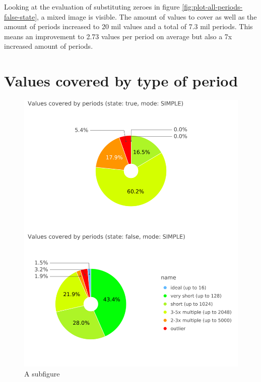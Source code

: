 Looking at the evaluation of substituting zeroes in figure \ref{fig:plot-all-periods-false-state}, a mixed image is visible. The amount of values to cover as well as the amount of periods increased to 20 mil values and a total of 7.3 mil periods. This means an improvement to 2.73 values per period on average but also a 7x increased amount of periods.

\newpage

\section{Values covered by type of period}

\begin{figure}[b]
	\includegraphics[width=\linewidth]{charts/all-covered-values-pie-chart-combined-ontop.png}
	\caption{A subfigure}
	\label{fig:plot}
\end{figure}

